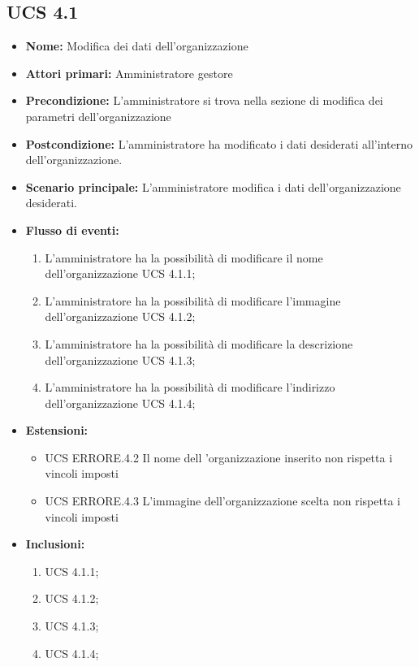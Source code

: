 \subsection{UCS 4.1}%
\begin{itemize}
    \item \textbf{Nome:} Modifica dei dati dell'organizzazione
    \item \textbf{Attori primari:} Amministratore gestore
    \item \textbf{Precondizione:} L'amministratore si trova nella sezione di modifica dei parametri dell'organizzazione
    \item \textbf{Postcondizione:} L'amministratore ha modificato i dati desiderati all'interno dell’organizzazione.
    \item \textbf{Scenario principale:} L'amministratore modifica i dati dell'organizzazione desiderati.
    \item \textbf{Flusso di eventi:}
    \begin{enumerate}
        \item L'amministratore ha la possibilità di modificare il nome dell'organizzazione UCS 4.1.1;
        \item L'amministratore ha la possibilità di modificare l'immagine dell'organizzazione UCS 4.1.2;
        \item L'amministratore ha la possibilità di modificare la descrizione dell'organizzazione UCS 4.1.3;
        \item L'amministratore ha la possibilità di modificare l'indirizzo dell'organizzazione UCS 4.1.4;
    \end{enumerate}
    \item \textbf{Estensioni:}
    \begin{itemize}
        \item UCS ERRORE.4.2 Il nome dell 'organizzazione inserito non rispetta i vincoli imposti
        \item UCS ERRORE.4.3 L'immagine dell'organizzazione scelta non rispetta i vincoli imposti
    \end{itemize}
    \item \textbf{Inclusioni:}
    \begin{enumerate}
	    \item UCS 4.1.1;
	    \item UCS 4.1.2;
	    \item UCS 4.1.3;
	    \item UCS 4.1.4;
    \end{enumerate}
\end{itemize}


